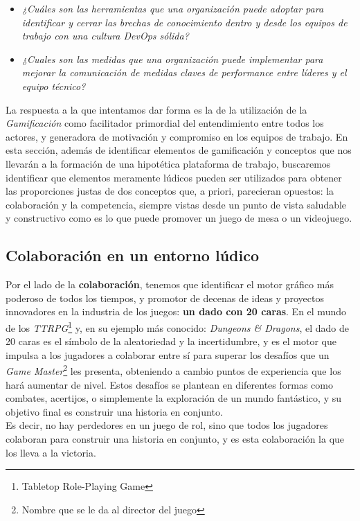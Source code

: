 \documentclass[journal]{IEEEtran}
\begin{document}
\begin{itemize}
    \item \textit{¿Cuáles son las herramientas que una organización puede adoptar para identificar y cerrar las brechas de conocimiento dentro y desde los equipos de trabajo con una cultura DevOps sólida?}
    \item \textit{¿Cuales son las medidas que una organización puede implementar para mejorar la comunicación de medidas claves de performance entre líderes y el equipo técnico?}
\end{itemize}
La respuesta a la que intentamos dar forma es la de la utilización de la \textit{Gamificación} como facilitador primordial del entendimiento entre todos los actores, y generadora de motivación y compromiso en los equipos de trabajo.
En esta sección, además de identificar elementos de gamificación y conceptos que nos llevarán a la formación de una hipotética plataforma de trabajo, buscaremos identificar que elementos meramente lúdicos pueden ser utilizados para obtener las proporciones justas de dos conceptos que, a priori, parecieran opuestos: la colaboración y la competencia, siempre vistas desde un punto de vista saludable y constructivo como es lo que puede promover un juego de mesa o un videojuego.

\subsection{\textbf{Colaboración en un entorno lúdico}}
Por el lado de la \textbf{colaboración}, tenemos que identificar el motor gráfico más poderoso de todos los tiempos, y promotor de decenas de ideas y proyectos innovadores en la industria de los juegos: \textbf{un dado con 20 caras}. En el mundo de los \textit{TTRPG}\footnote{Tabletop Role-Playing Game} y, en su ejemplo más conocido: \textit{Dungeons \& Dragons}, el dado de 20 caras es el símbolo de la aleatoriedad y la incertidumbre, y es el motor que impulsa a los jugadores a colaborar entre sí para superar los desafíos que un \textit{Game Master}\footnote{Nombre que se le da al director del juego} les presenta, obteniendo a cambio puntos de experiencia que los hará aumentar de nivel. Estos desafíos se plantean en diferentes formas como combates, acertijos, o simplemente la exploración de un mundo fantástico, y su objetivo final es construir una historia en conjunto.
\\Es decir, no hay perdedores en un juego de rol, sino que todos los jugadores colaboran para construir una historia en conjunto, y es esta colaboración la que los lleva a la victoria.
\end{document}
